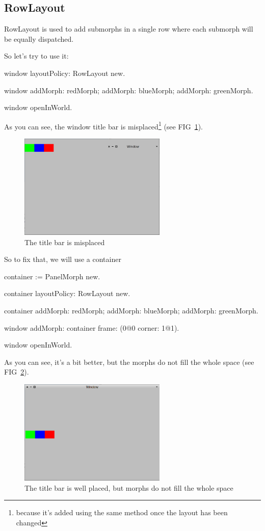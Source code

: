 \documentclass[a4paper,10pt,twoside]{book}
\begin{document}
\subsection{RowLayout}

RowLayout is used to add submorphs in a single row where each submorph will be equally dispatched.

So let's try to use it: 
\begin{code}{}
window layoutPolicy: RowLayout new.

window 
	addMorph: redMorph;
	addMorph: blueMorph;
	addMorph: greenMorph.

window openInWorld.
\end{code}

As you can see, the window title bar is misplaced\footnote{because it's added using the same method once the layout has been changed} (see FIG~\ref{fig:rowLayout1}).

\begin{figure}[ht]\centering
	\includegraphics[width=7cm]{RowLayout1}
	\caption{The title bar is misplaced}
	\label{fig:rowLayout1}
\end{figure}

So to fix that, we will use a container
\begin{code}{}
container := PanelMorph new.

container layoutPolicy: RowLayout new.

container 
	addMorph: redMorph;
	addMorph: blueMorph;
	addMorph: greenMorph.

window
	addMorph: container
	frame: (0@0 corner: 1@1).

window openInWorld.
\end{code}

As you can see, it's a bit better, but the morphs do not fill the whole space (see FIG~\ref{fig:rowLayout2}).

\begin{figure}[ht]\centering
	\includegraphics[width=7cm]{RowLayout2}
	\caption{The title bar is well placed, but morphs do not fill the whole space}
	\label{fig:rowLayout2}
\end{figure}
\end{document}
